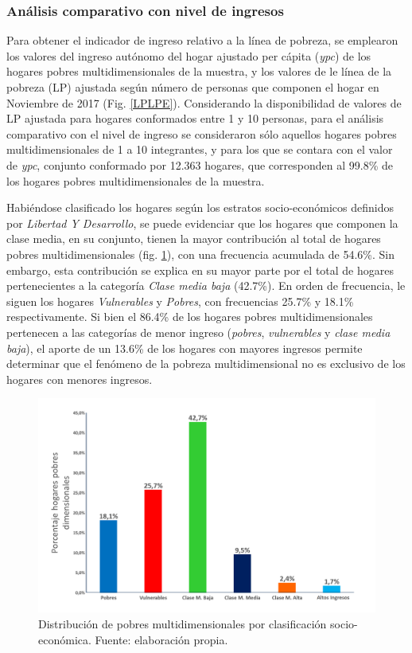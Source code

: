 \documentclass[12pt,letterpaper,spanish]{article}
\begin{document}
\subsubsection{Análisis comparativo con nivel de ingresos}


Para obtener el indicador de ingreso relativo a la línea de pobreza, se emplearon los valores del ingreso autónomo del hogar ajustado per cápita (\textit{ypc}) de los hogares pobres multidimensionales de la muestra, y los valores de le línea de la pobreza (LP) ajustada según número de personas que componen el hogar en Noviembre de 2017 (Fig. \ref{LPLPE}). Considerando la disponibilidad de valores de LP ajustada para hogares conformados entre 1 y 10 personas, para el análisis comparativo con el nivel de ingreso se consideraron sólo aquellos hogares pobres multidimensionales de 1 a 10 integrantes, y para los que se contara con el valor de \textit{ypc}, conjunto conformado por 12.363 hogares, que corresponden al 99.8\% de los hogares pobres multidimensionales de la muestra.


Habiéndose clasificado los hogares según los estratos socio-económicos definidos por \textit{Libertad Y Desarrollo}\cite{LibertadyDesarrollo2019HaciaChile}, se puede evidenciar que los hogares que componen la clase media, en su conjunto, tienen la mayor contribución al total de hogares pobres multidimensionales (fig. \ref{distribucion_socio_pobres}), con una frecuencia acumulada de 54.6\%. Sin embargo, esta contribución se explica en su mayor parte por el total de hogares pertenecientes a la categoría \textit{Clase media baja} (42.7\%). En orden de frecuencia, le siguen los hogares \textit{Vulnerables} y \textit{Pobres}, con frecuencias 25.7\% y 18.1\% respectivamente. Si bien el 86.4\% de los hogares pobres multidimensionales pertenecen a las categorías de menor ingreso (\textit{pobres}, \textit{vulnerables} y \textit{clase media baja}), el aporte de un 13.6\% de los hogares con mayores ingresos permite determinar que el fenómeno de la pobreza multidimensional no es exclusivo de los hogares con menores ingresos.

\begin{figure}[H]
    \centering
    \includegraphics[height=8 cm]{Max/distribucion_pobres_clase.png}
    \caption{Distribución de pobres multidimensionales por clasificación socio-económica. Fuente: elaboración propia.}
    \label{distribucion_socio_pobres}
\end{figure}
\end{document}
